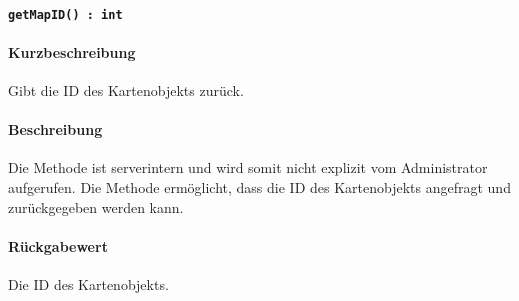 \paragraph{\texttt{getMapID() : int}}%
\paragraph*{Kurzbeschreibung}
Gibt die ID des Kartenobjekts zurück.
\paragraph*{Beschreibung}
Die Methode ist serverintern und wird somit nicht explizit vom Administrator aufgerufen.
Die Methode ermöglicht, dass die ID des Kartenobjekts angefragt und zurückgegeben werden kann.
\paragraph*{Rückgabewert}
Die ID des Kartenobjekts.
